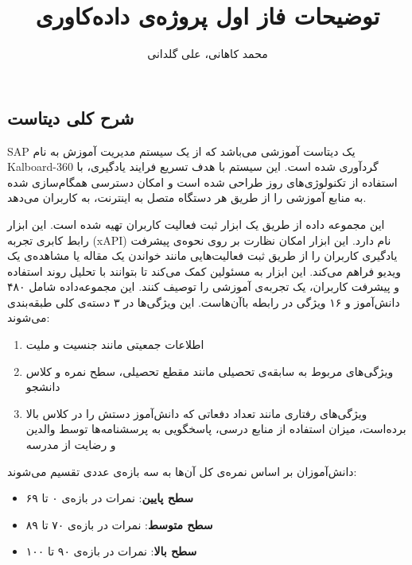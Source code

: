 \documentclass{article}
\title{\textbf{توضیحات فاز اول پروژه‌ی داده‌کاوری}}
\author{محمد کاهانی، علی گلدانی}
\date{\parbox{\linewidth}{\centering
    عنوان پایگاه داده: SAP\endgraf
    \today\endgraf
    }}
\begin{document}
    \maketitle

    \begin{large}
        \section{شرح کلی دیتاست}
        SAP یک دیتاست آموزشی می‌باشد که از یک سیستم مدیریت آموزش به نام Kalboard-360 گردآوری شده است.
        این سیستم با هدف تسریع فرایند یادگیری، با استفاده از تکنولوژی‌های روز طراحی شده است و
        امکان دسترسی همگام‌سازی شده به منابع آموزشی را از طریق هر دستگاه متصل به اینترنت، به کاربران می‌دهد.

        این مجموعه داده از طریق یک ابزار ثبت فعالیت کاربران تهیه شده است. این ابزار رابط کابری تجربه (xAPI) نام دارد.
        این ابزار امکان نظارت بر روی نحوه‌ی پیشرفت یادگیری کاربران را از طریق ثبت فعالیت‌هایی مانند خواندن یک مقاله یا مشاهده‌ی یک ویدیو فراهم می‌کند.
        این ابزار به مسئولین کمک می‌کند تا بتوانند با تحلیل روند استفاده و پیشرفت کاربران، یک تجربه‌ی آموزشی را توصیف کنند.
        این مجموعه‌داده شامل ۴۸۰ دانش‌آموز و ۱۶ ویژگی در رابطه باآن‌هاست. این ویژگی‌ها در ۳ دسته‌ی کلی طبقه‌بندی می‌شوند:
        \begin{enumerate}
            \item اطلاعات جمعیتی مانند جنسیت و ملیت
            \item ویژگی‌های مربوط به سابقه‌ی تحصیلی مانند مقطع تحصیلی، سطح نمره و کلاس دانشجو
            \item ویژگی‌های رفتاری مانند تعداد دفعاتی که دانش‌آموز دستش را در کلاس بالا برده‌است، میزان استفاده از منابع درسی، پاسخگویی به پرسشنامه‌ها توسط والدین و رضایت از مدرسه
        \end{enumerate}
        دانش‌آموزان بر اساس نمره‌ی کل آن‌ها به سه بازه‌ی عددی تقسیم می‌شوند:
        \begin{itemize}
            \item \textbf{سطح پایین}: نمرات در بازه‌ی ۰ تا ۶۹
            \item \textbf{سطح متوسط}: نمرات در بازه‌ی ۷۰ تا ۸۹
            \item \textbf{سطح بالا}: نمرات در بازه‌ی ۹۰ تا ۱۰۰
        \end{itemize}


\end{large}
\end{document}
